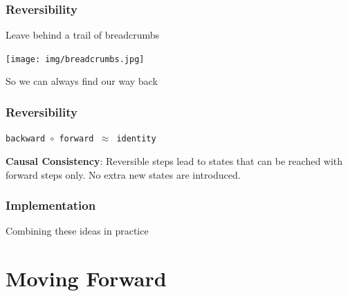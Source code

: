 \documentclass[12pt]{beamer}
\begin{document}
\begin{frame}
\frametitle{Reversibility}


\begin{center}
    \Large{Leave behind a trail of breadcrumbs} 
    \begin{center}
        \texttt{[image: img/breadcrumbs.jpg]}
    \end{center}
So we can always find our way back
\end{center}
\end{frame}


\begin{frame}
\frametitle{Reversibility}

\begin{center}
    \Large{\texttt{backward $\circ$ forward $\approx$ identity}}
\end{center}

\textbf{Causal Consistency}: Reversible steps lead to states that can be reached with forward steps only. No extra new states are introduced.



\end{frame}






\begin{frame}[fragile]
\frametitle{Implementation}

\begin{center}
    \Large{Combining these ideas in practice}
\end{center}
\end{frame}


\section{Moving Forward}
\end{document}
